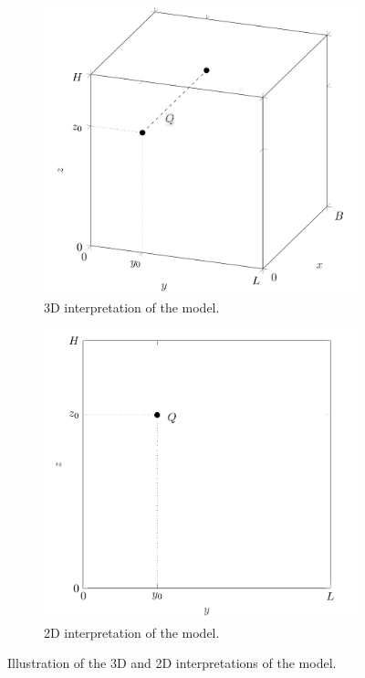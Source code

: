 \begin{figure}[H]
	\centering
 	\begin{subfigure}[b]{0.48\textwidth}
        \includegraphics[width=\textwidth]{fig/testcase_scheme3D.png}
        \caption{3D interpretation of the model.}
        \label{fig:testcase_scheme3D}
    \end{subfigure}
	\begin{subfigure}[b]{0.48\textwidth}
        \includegraphics[width=\textwidth]{fig/testcase_scheme2D.png}
        \caption{2D interpretation of the model.}
        \label{fig:testcase_scheme2D}
    \end{subfigure}
    \caption{Illustration of the 3D and 2D interpretations of the model.}
    \label{fig:testcase_scheme}
\end{figure}

